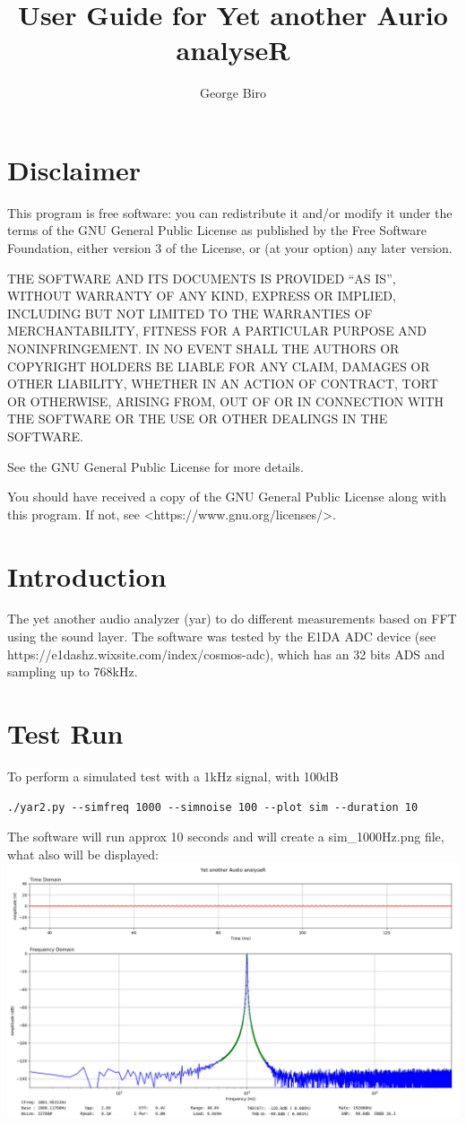 \documentclass[10pt,a4paper]{article}
\author{George Biro}
\title{User Guide for Yet another Aurio analyseR}
\begin{document}
\maketitle
\tableofcontents
\pagebreak
\section{Disclaimer}
This program is free software: you can redistribute it and/or modify it under the terms of the GNU General Public License as published by the Free Software Foundation, either version 3 of the License, or (at your option) any later version.

THE SOFTWARE AND ITS DOCUMENTS IS PROVIDED “AS IS”, WITHOUT WARRANTY OF ANY KIND, EXPRESS OR IMPLIED, INCLUDING BUT NOT LIMITED TO THE WARRANTIES OF MERCHANTABILITY, FITNESS FOR A PARTICULAR PURPOSE AND NONINFRINGEMENT. IN NO EVENT SHALL THE AUTHORS OR COPYRIGHT HOLDERS BE LIABLE FOR ANY CLAIM, DAMAGES OR OTHER LIABILITY, WHETHER IN AN ACTION OF CONTRACT, TORT OR OTHERWISE, ARISING FROM, OUT OF OR IN CONNECTION WITH THE SOFTWARE OR THE USE OR OTHER DEALINGS IN THE SOFTWARE.
 
See the GNU General Public License for more details.

You should have received a copy of the GNU General Public License along with this program. If not, see <https://www.gnu.org/licenses/>.

\section{Introduction}
The yet another audio analyzer (yar) to do different measurements based on FFT using the sound layer. The software was tested by the E1DA ADC device (see https://e1dashz.wixsite.com/index/cosmos-adc), which has an 32 bits ADS and sampling up to 768kHz.
\section{Test Run}
To perform a simulated test with a 1kHz signal, with 100dB
\begin{verbatim}
./yar2.py --simfreq 1000 --simnoise 100 --plot sim --duration 10
\end{verbatim}
The software will run approx 10 seconds and will create a sim\_1000Hz.png file, what also will be displayed:
\includegraphics[width=\textwidth]{sim_1000Hz.png}
\end{document}
